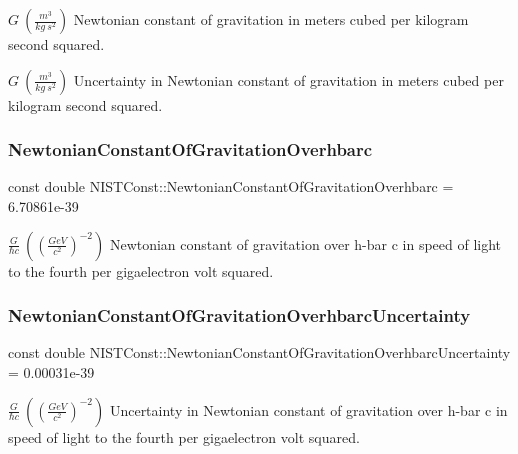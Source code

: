 $G \ (\frac{m^3}{kg\ s^2})$ Newtonian constant of gravitation in meters cubed per kilogram second squared.

$G \ (\frac{m^3}{kg\ s^2})$ Uncertainty in Newtonian constant of gravitation in meters cubed per kilogram second squared. \mbox{\label{group___gravitational_constant_gad7c8d8ef09f60e8f3f36f86f98df0472}} 
\subsubsection{\texorpdfstring{Newtonian\+Constant\+Of\+Gravitation\+Overhbarc}{NewtonianConstantOfGravitationOverhbarc}}
{\footnotesize\ttfamily const double N\+I\+S\+T\+Const\+::\+Newtonian\+Constant\+Of\+Gravitation\+Overhbarc = 6.\+70861e-\/39}

$\frac{G}{\hbar c} \ ((\frac{GeV}{c^2})^{-2})$ Newtonian constant of gravitation over h-\/bar c in speed of light to the fourth per gigaelectron volt squared. \mbox{\label{group___gravitational_constant_gaf10cbbd8ad1ece4ec01e35fe3d86854f}} 
\subsubsection{\texorpdfstring{Newtonian\+Constant\+Of\+Gravitation\+Overhbarc\+Uncertainty}{NewtonianConstantOfGravitationOverhbarcUncertainty}}
{\footnotesize\ttfamily const double N\+I\+S\+T\+Const\+::\+Newtonian\+Constant\+Of\+Gravitation\+Overhbarc\+Uncertainty = 0.\+00031e-\/39}

$\frac{G}{\hbar c} \ ((\frac{GeV}{c^2})^{-2})$ Uncertainty in Newtonian constant of gravitation over h-\/bar c in speed of light to the fourth per gigaelectron volt squared. 